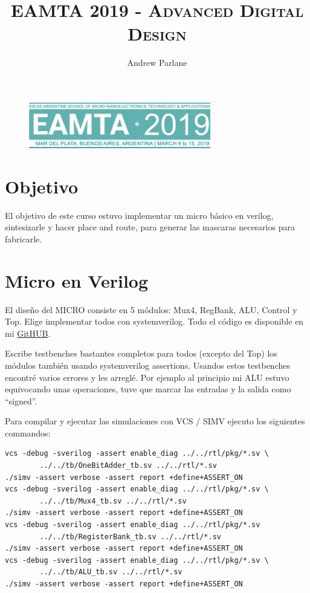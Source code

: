 \documentclass[a4paper]{article}
\begin{document}
\begin{figure}
\centering
\includegraphics[scale=1]{./img/logo}
\end{figure}

\title{\large\textsc{EAMTA 2019 - Advanced Digital Design}}

\author{
Andrew Parlane \\
}

\maketitle

\newpage

\section{Objetivo}

El objetivo de este curso estuvo implementar un micro básico en verilog, sintesizarle y hacer place and route, para generar las mascaras necesarios para fabricarle.

\section{Micro en Verilog}

El diseño del MICRO consiste en 5 módulos: Mux4, RegBank, ALU, Control y Top. Elige implementar todos con systemverilog. Todo el código es disponible en mi \href{https://github.com/andrewparlane/EAMTA2019}{GitHUB}.

Escribe testbenches bastantes completos para todos (excepto del Top) los módulos también usando systemverilog assertions. Usandos estos testbenches encontré varios errores y les arreglé. Por ejemplo al principio mi ALU estuvo equivocando unas operaciones, tuve que marcar las entradas y la salida como ``signed''.

Para compilar y ejecutar las simulaciones con VCS / SIMV ejecuto los siguientes commandos:

\begin{verbatim}
vcs -debug -sverilog -assert enable_diag ../../rtl/pkg/*.sv \
        ../../tb/OneBitAdder_tb.sv ../../rtl/*.sv
./simv -assert verbose -assert report +define+ASSERT_ON
vcs -debug -sverilog -assert enable_diag ../../rtl/pkg/*.sv \
        ../../tb/Mux4_tb.sv ../../rtl/*.sv
./simv -assert verbose -assert report +define+ASSERT_ON
vcs -debug -sverilog -assert enable_diag ../../rtl/pkg/*.sv 
        ../../tb/RegisterBank_tb.sv ../../rtl/*.sv
./simv -assert verbose -assert report +define+ASSERT_ON
vcs -debug -sverilog -assert enable_diag ../../rtl/pkg/*.sv \
        ../../tb/ALU_tb.sv ../../rtl/*.sv
./simv -assert verbose -assert report +define+ASSERT_ON
\end{verbatim}
\end{document}
